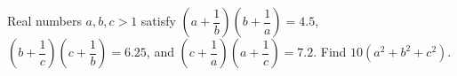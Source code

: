 Real numbers $a,b,c>1$ satisfy $(a+\dfrac{1}{b})(b+\dfrac{1}{a})=4.5$, $(b+\dfrac{1}{c})(c+\dfrac{1}{b})=6.25$, and $(c+\dfrac{1}{a})(a+\dfrac{1}{c})=7.2$. Find $10(a^2+b^2+c^2)$.
